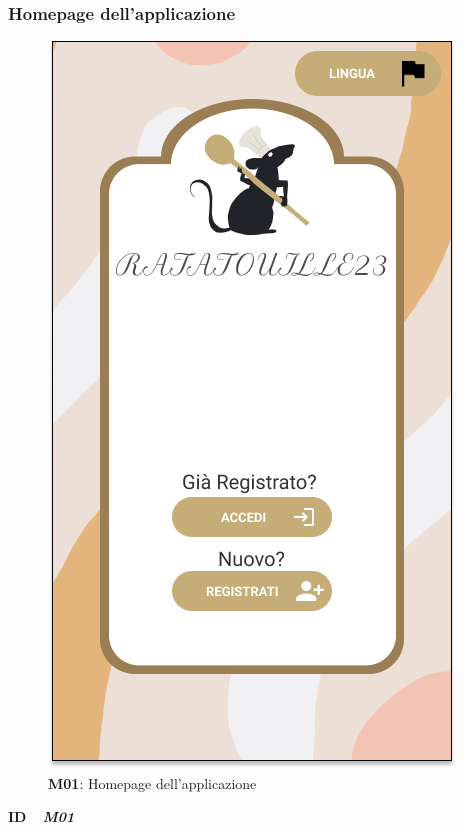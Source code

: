     \newpage

    \subsubsection{Homepage dell'applicazione}
        \begin{figure}[H]
          \centering
          \includegraphics[scale=0.5]{assets/diagrammi/Mockup/Mockup_Homepage.png}
          \caption{\textbf{M01}: Homepage dell'applicazione}\label{fig:Mockup_Homepage}
        \end{figure}

        \newpage

        \begin{flushleft}
            \textbf{ID} \ \Large{ \emph{\textbf{M01}}}\\
        \end{flushleft}

